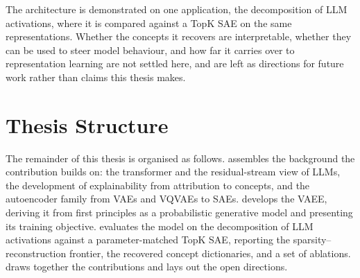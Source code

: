The architecture is demonstrated on one application, the decomposition of
\ac{LLM} activations, where it is compared against a TopK \ac{SAE} on the same
representations. Whether the concepts it recovers are interpretable, whether
they can be used to steer model behaviour, and how far it carries over to
representation learning are not settled here, and are left as directions for
future work rather than claims this thesis makes.

\section{Thesis Structure} \label{sec:intro:structure}

The remainder of this thesis is organised as follows. 
assembles the background the contribution builds on: the transformer and the
residual-stream view of \acp{LLM}, the development of explainability from
attribution to concepts, and the autoencoder family from \acp{VAE} and
\acp{VQVAE} to \acp{SAE}.  develops the
\ac{VAEE}, deriving it from first principles as a probabilistic generative model
and presenting its training objective. 
evaluates the model on the decomposition of \ac{LLM} activations against a
parameter-matched TopK \ac{SAE}, reporting the sparsity--reconstruction
frontier, the recovered concept dictionaries, and a set of ablations.
 draws together the contributions
and lays out the open directions.

\acresetall

